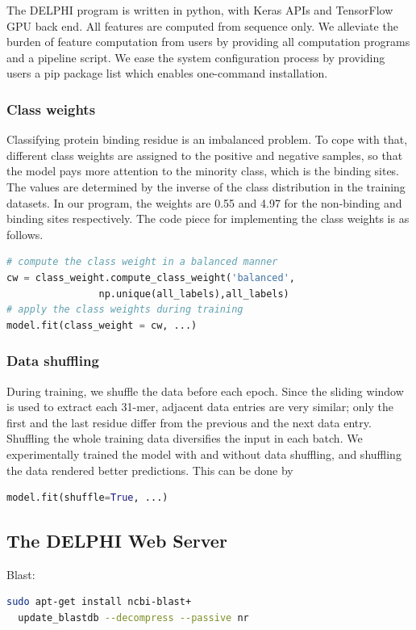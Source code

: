 The DELPHI program is written in python, with Keras \cite{chollet2015keras} APIs and TensorFlow GPU back end. All features are computed from sequence only. We alleviate the burden of feature computation from users by providing all computation programs and a pipeline script. We ease the system configuration process by providing users a pip package list which enables one-command installation. 

\subsubsection{Class weights}
Classifying protein binding residue is an imbalanced problem. To cope with that, different class weights \cite{ting2002instance} are assigned to the positive and negative samples, so that the model pays more attention to the minority class, which is the binding sites.  The values are determined by the inverse of the class distribution in the training datasets. In our program, the weights are 0.55 and 4.97 for the non-binding and binding sites respectively. The code piece for implementing the class weights is as follows.
\begin{lstlisting}[language=python,frame=single,basicstyle=\small]
# compute the class weight in a balanced manner
cw = class_weight.compute_class_weight('balanced',
                np.unique(all_labels),all_labels)
# apply the class weights during training
model.fit(class_weight = cw, ...)
\end{lstlisting}

\subsubsection{Data shuffling}
During training, we shuffle the data before each epoch. Since the sliding window is used to extract each 31-mer, adjacent data entries are very similar; only the first and the last residue differ from the previous and the next data entry. Shuffling the whole training data diversifies the input in each batch. We experimentally trained the model with and without data shuffling, and shuffling the data rendered better predictions. This can be done by 
\begin{lstlisting}[language=python,frame=single]
  model.fit(shuffle=True, ...)
\end{lstlisting}

\subsection{The DELPHI Web Server}
Blast:
\begin{lstlisting}[language=bash,frame=single]
  sudo apt-get install ncbi-blast+
  update_blastdb --decompress --passive nr
\end{lstlisting}

